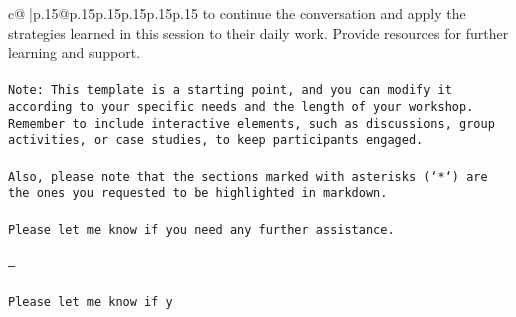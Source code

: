 \documentclass{article}
\begin{document}
{\begin{supertabular}{c@{$\;$}|p{.15\linewidth}@{}p{.15\linewidth}p{.15\linewidth}p{.15\linewidth}p{.15\linewidth}p{.15\linewidth}}
{{{to continue the conversation and apply the strategies learned in this session to their daily work. Provide resources for further learning and support. \\ \tt \\ \tt Note: This template is a starting point, and you can modify it according to your specific needs and the length of your workshop. Remember to include interactive elements, such as discussions, group activities, or case studies, to keep participants engaged. \\ \tt \\ \tt Also, please note that the sections marked with asterisks (`*`) are the ones you requested to be highlighted in markdown. \\ \tt \\ \tt Please let me know if you need any further assistance. \\ \tt \\ \tt ---\\ \tt \\ \tt Please let me know if y}}}
\end{supertabular}}
\end{document}
